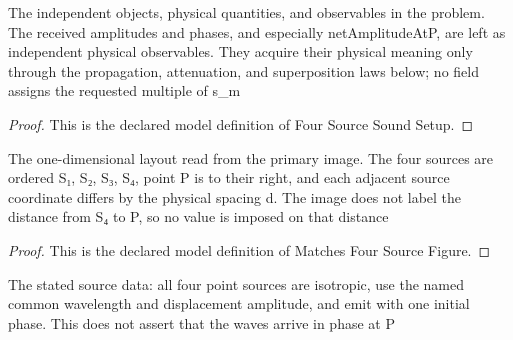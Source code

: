 \begin{definition}
  \label{def:physics:phyx-mini-0313:phyxminiproblems-problemphyxmini0313-foursourcesoundsetup}
  The independent objects, physical quantities, and observables in the problem. The received amplitudes and phases, and especially netAmplitudeAtP, are left as independent physical observables. They acquire their physical meaning only through the propagation, attenuation, and superposition laws below; no field assigns the requested multiple of s\_m
\end{definition}
\begin{proof}
  This is the declared model definition of Four Source Sound Setup.
\end{proof}
\begin{definition}
  \label{def:physics:phyx-mini-0313:phyxminiproblems-problemphyxmini0313-matchesfoursourcefigure}
  The one-dimensional layout read from the primary image. The four sources are ordered S₁, S₂, S₃, S₄, point P is to their right, and each adjacent source coordinate differs by the physical spacing d. The image does not label the distance from S₄ to P, so no value is imposed on that distance
\end{definition}
\begin{proof}
  This is the declared model definition of Matches Four Source Figure.
\end{proof}
\begin{definition}
  \label{def:physics:phyx-mini-0313:phyxminiproblems-problemphyxmini0313-hasidenticalcoherentpointsources}
  The stated source data: all four point sources are isotropic, use the named common wavelength and displacement amplitude, and emit with one initial phase. This does not assert that the waves arrive in phase at P
\end{definition}
